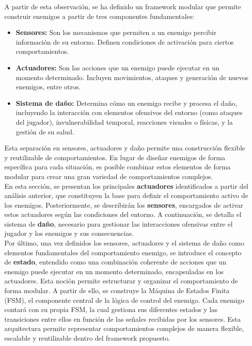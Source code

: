 A partir de esta observación, se ha definido un framework modular que permite construir enemigos a partir de tres componentes fundamentales:

\begin{itemize}
  \item \textbf{Sensores:} Son los mecanismos que permiten a un enemigo percibir información de su entorno. Definen condiciones de activación para ciertos comportamientos.
  \item \textbf{Actuadores:} Son las acciones que un enemigo puede ejecutar en un momento determinado. Incluyen movimientos, ataques y generación de nuevos enemigos, entre otros.
  \item \textbf{Sistema de daño:} Determina cómo un enemigo recibe y procesa el daño, incluyendo la interacción con elementos ofensivos del entorno (como ataques del jugador), invulnerabilidad temporal, reacciones visuales o físicas, y la gestión de su salud.
\end{itemize}

Esta separación en sensores, actuadores y daño permite una construcción flexible y reutilizable de comportamientos. En lugar de diseñar enemigos de forma específica para cada situación, es posible combinar estos elementos de forma modular para crear una gran variedad de comportamientos complejos.\\

En esta sección, se presentan los principales \textbf{actuadores} identificados a partir del análisis anterior, que constituyen la base para definir el comportamiento activo de los enemigos. Posteriormente, se describirán los \textbf{sensores}, encargados de activar estos actuadores según las condiciones del entorno. A continuación, se detalla el sistema de \textbf{daño}, necesario para gestionar las interacciones ofensivas entre el jugador y los enemigos y sus consecuencias.\\

Por último, una vez definidos los sensores, actuadores y el sistema de daño como elementos fundamentales del comportamiento enemigo, se introduce el concepto de \textbf{estado}, entendido como una combinación coherente de acciones que un enemigo puede ejecutar en un momento determinado, encapsuladas en los actuadores. Esta noción permite estructurar y organizar el comportamiento de forma modular. A partir de ello, se construye la Máquina de Estados Finita (FSM), el componente central de la lógica de control del enemigo. Cada enemigo contará con su propia FSM, la cual gestiona sus diferentes estados y las transiciones entre ellos en función de las señales recibidas por los sensores. Esta arquitectura permite representar comportamientos complejos de manera flexible, escalable y reutilizable dentro del framework propuesto.\\

